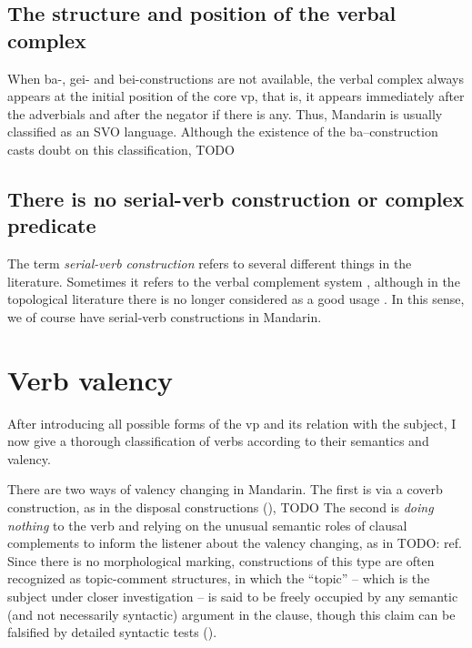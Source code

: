 \documentclass[UTF8, a4paper, oneside, scheme=plain]{ctexrep}
\newcommand*{\citesec}[1]{\S~{#1}}
\newcommand*{\term}[1]{\emph{#1}}
\begin{document}
\section{The structure and position of the verbal complex}

When ba-, gei- and bei-constructions are not available,
the verbal complex always appears at the initial position 
of the core \acs{vp}, 
that is, it appears immediately after the adverbials 
and after the negator if there is any. 
Thus, Mandarin is usually classified as an SVO language.
Although the existence of the ba--construction
casts doubt on this classification, 
TODO

\section{There is no serial-verb construction or complex predicate}\label{sec:no-serial-verb}

The term \term{serial-verb construction} refers to several different things in the literature.
Sometimes it refers to the verbal complement system
\citep{chen2016mandarin}, 
although in the topological literature 
there is no longer considered as a good usage 
\citep[\citesec{10.1}; note that %
the V2s in Yakkha complex predication highly resembles Mandarin directional verbal complements 
in their formal aspects]{schackow2015grammar}. 
In this sense, we of course have serial-verb constructions in Mandarin.

\chapter{Verb valency}

After introducing all possible forms of the \acs{vp}
and its relation with the subject,
I now give a thorough classification of verbs 
according to their semantics and valency.

There are two ways of valency changing in Mandarin.
The first is via a coverb construction, 
as in the disposal constructions (),
TODO 
The second is \emph{doing nothing} to the verb 
and relying on the unusual semantic roles of clausal complements 
to inform the listener about the valency changing,
as in TODO: ref.
Since there is no morphological marking,
constructions of this type are often recognized as topic-comment structures,
in which the ``topic'' -- which is the subject under closer investigation -- 
is said to be freely occupied by any semantic (and not necessarily syntactic) argument in the clause,
though this claim can be falsified by detailed syntactic tests ().
\end{document}
